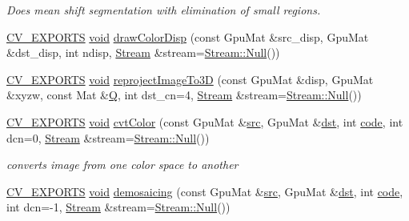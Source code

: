 \begin{DoxyCompactItemize}
\begin{DoxyCompactList}\small\item\em Does mean shift segmentation with elimination of small regions. \end{DoxyCompactList}\item 
\hyperlink{core_2types__c_8h_a1bf9f0e121b54272da02379cfccd0a2b}{C\-V\-\_\-\-E\-X\-P\-O\-R\-T\-S} \hyperlink{legacy_8hpp_a8bb47f092d473522721002c86c13b94e}{void} \hyperlink{namespacecv_1_1gpu_addc62c4b5e8d600e649c100c2852ccf9}{draw\-Color\-Disp} (const Gpu\-Mat \&src\-\_\-disp, Gpu\-Mat \&dst\-\_\-disp, int ndisp, \hyperlink{classcv_1_1gpu_1_1Stream}{Stream} \&stream=\hyperlink{classcv_1_1gpu_1_1Stream_af96c23564834f88333dcb8997df553f1}{Stream\-::\-Null}())
\item 
\hyperlink{core_2types__c_8h_a1bf9f0e121b54272da02379cfccd0a2b}{C\-V\-\_\-\-E\-X\-P\-O\-R\-T\-S} \hyperlink{legacy_8hpp_a8bb47f092d473522721002c86c13b94e}{void} \hyperlink{namespacecv_1_1gpu_a01e276592a2b8857754e3edee887b2d9}{reproject\-Image\-To3\-D} (const Gpu\-Mat \&disp, Gpu\-Mat \&xyzw, const Mat \&\hyperlink{calib3d_8hpp_a29d14baac63d86e6bbb0b03861384e2c}{Q}, int dst\-\_\-cn=4, \hyperlink{classcv_1_1gpu_1_1Stream}{Stream} \&stream=\hyperlink{classcv_1_1gpu_1_1Stream_af96c23564834f88333dcb8997df553f1}{Stream\-::\-Null}())
\item 
\hyperlink{core_2types__c_8h_a1bf9f0e121b54272da02379cfccd0a2b}{C\-V\-\_\-\-E\-X\-P\-O\-R\-T\-S} \hyperlink{legacy_8hpp_a8bb47f092d473522721002c86c13b94e}{void} \hyperlink{namespacecv_1_1gpu_aab8e9ff3ec24f52a104fc1bd80bdb10f}{cvt\-Color} (const Gpu\-Mat \&\hyperlink{legacy_8hpp_a371cd109b74033bc4366f584edd3dacc}{src}, Gpu\-Mat \&\hyperlink{photo__c_8h_aed13e2a25279b24dc954073233fef7a5}{dst}, int \hyperlink{imgproc__c_8h_a9a9fd13fa1f888f8baeda154bb1a3691}{code}, int dcn=0, \hyperlink{classcv_1_1gpu_1_1Stream}{Stream} \&stream=\hyperlink{classcv_1_1gpu_1_1Stream_af96c23564834f88333dcb8997df553f1}{Stream\-::\-Null}())
\begin{DoxyCompactList}\small\item\em converts image from one color space to another \end{DoxyCompactList}\item 
\hyperlink{core_2types__c_8h_a1bf9f0e121b54272da02379cfccd0a2b}{C\-V\-\_\-\-E\-X\-P\-O\-R\-T\-S} \hyperlink{legacy_8hpp_a8bb47f092d473522721002c86c13b94e}{void} \hyperlink{namespacecv_1_1gpu_a9578d09d6a7587d62e0d030cfab3e323}{demosaicing} (const Gpu\-Mat \&\hyperlink{legacy_8hpp_a371cd109b74033bc4366f584edd3dacc}{src}, Gpu\-Mat \&\hyperlink{photo__c_8h_aed13e2a25279b24dc954073233fef7a5}{dst}, int \hyperlink{imgproc__c_8h_a9a9fd13fa1f888f8baeda154bb1a3691}{code}, int dcn=-\/1, \hyperlink{classcv_1_1gpu_1_1Stream}{Stream} \&stream=\hyperlink{classcv_1_1gpu_1_1Stream_af96c23564834f88333dcb8997df553f1}{Stream\-::\-Null}())

\end{DoxyCompactItemize}
